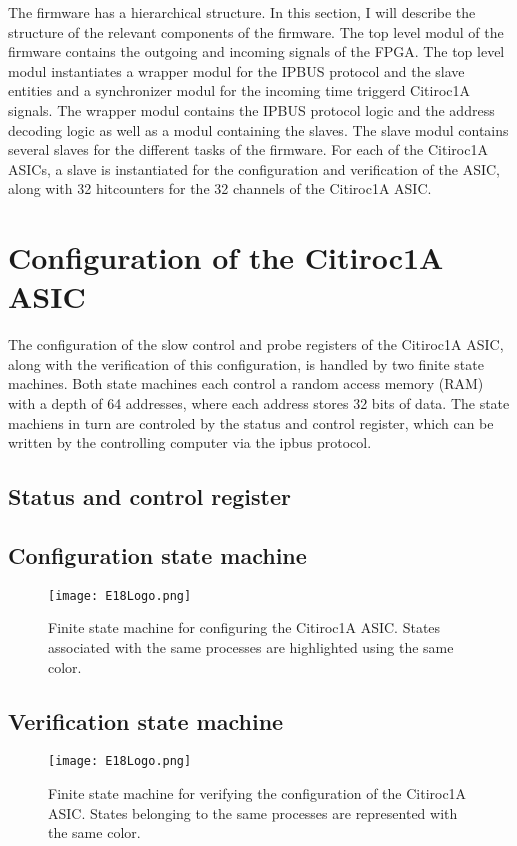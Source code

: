 The firmware has a hierarchical structure. In this section, I will describe the structure of the relevant components of the firmware.
\newline
The top level modul of the firmware contains the outgoing and incoming signals of the FPGA.
\newline
The top level modul instantiates a wrapper modul for the IPBUS protocol and the slave entities and a synchronizer modul for the incoming time triggerd Citiroc1A signals. 
\newline
The wrapper modul  contains the IPBUS protocol logic and the address decoding logic as well as a modul containing the slaves.
\newline
The slave modul contains several slaves for the different tasks of the firmware. For each of the Citiroc1A ASICs, a slave is instantiated for the configuration and verification of the ASIC, along with
32 hitcounters for the 32 channels of the Citiroc1A ASIC. 



\section{Configuration of the Citiroc1A ASIC}

The configuration of the slow control and probe registers of the Citiroc1A ASIC,
 along with the verification of this configuration, is handled by two finite state machines. Both state machines each control a random access memory (RAM) with a depth of 64 addresses, where each address stores 32 bits of data.
The state machiens in turn are controled by the status and control register, which can be written by the controlling computer via the ipbus protocol.
\subsection{Status and control register}

\subsection{Configuration state machine}
\begin{figure}[H]
    \centering
    \texttt{[image: E18Logo.png]}%
    \caption{Finite state machine for configuring the Citiroc1A ASIC.
    States associated with the same processes are highlighted using the same color.}
    \label{fig:Configuration_state_machine}
\end{figure}
\subsection{Verification state machine}
\begin{figure}[H]
    \centering
    \texttt{[image: E18Logo.png]}%
    \caption{Finite state machine for verifying the configuration of the Citiroc1A ASIC.
    States belonging to the same processes are represented with the same color.}
    \label{fig:Verification_state_machine}
\end{figure}
